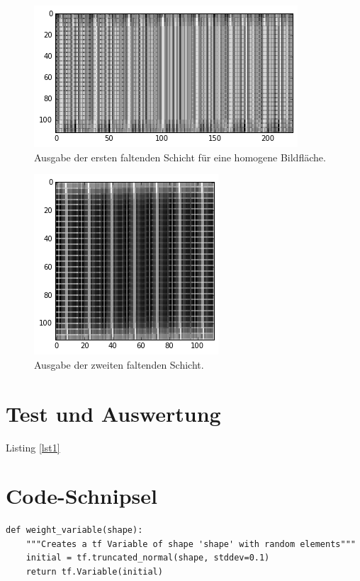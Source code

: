\documentclass[10pt,journal,compsoc]{IEEEtran}
\begin{document}
\begin{figure}[!h]
\centering
\includegraphics[scale=0.6]{conv1_on_plain_image}
\caption{Ausgabe der ersten faltenden Schicht für eine homogene Bildfläche.}
\end{figure}
\begin{figure}[!h]
\centering
\includegraphics[scale=0.8]{conv2_on_conv1_on_plain_image}
\caption{Ausgabe der zweiten faltenden Schicht.}
\end{figure}

\newpage
\section{Test und Auswertung}
Listing \ref{lst1}

\appendices
\newpage
\section{Code-Schnipsel}

\begin{lstlisting}[caption={Erzeugt ein Gewichts-Array mit zufällig initialisierten Werten. Die Dimensionen werden als Parameter entegengenommen.}, label=lst1]
def weight_variable(shape):
    """Creates a tf Variable of shape 'shape' with random elements"""
    initial = tf.truncated_normal(shape, stddev=0.1)
    return tf.Variable(initial)
\end{lstlisting}
\end{document}
